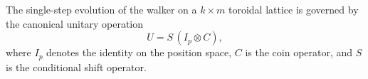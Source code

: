 The single-step evolution of the walker on a $k \times m$ toroidal
lattice is governed by the canonical unitary operation
\begin{equation}
  U = S \, (I_p \otimes C),
  \label{eq:general-evolution}
\end{equation}
where $I_p$ denotes the identity on the position space, $C$ is the coin
operator, and $S$ is the conditional shift operator.
